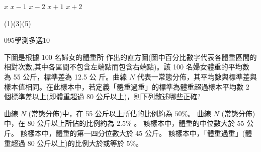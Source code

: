 \begin{QUESTIONS}
\begin{QUESTION}
\begin{QBODY}
			\begin{QOPSINONELINE} 
				\QOP $x$    \QOP $x-1$    \QOP $x-2$    \QOP $x+1$    \QOP $x+2$
			\end{QOPSINONELINE}
        \end{QBODY}
        \begin{QFROMS}
        \end{QFROMS}
        \begin{QTAGS}\end{QTAGS}
        \begin{QANS}
            (1)(3)(5)
        \end{QANS}
        \begin{QSOLLIST}
        \end{QSOLLIST}
        \begin{QEMPTYSPACE}
        \end{QEMPTYSPACE}
    \end{QUESTION}
    \begin{QUESTION}
        \begin{ExamInfo}{095}{學測}{多選}{10}
        \end{ExamInfo}
        \begin{ExamAnsRateInfo}{27}{48}{23}{10}
        \end{ExamAnsRateInfo}
        \begin{QBODY}
			下圖是根據 100 名婦女的體重所 作出的直方圖(圖中百分比數字代表各體重區間的相對次數,其中各區間不包含左端點而包含右端點)。該 100 名婦女體重的平均數 為 55 公斤，標準差為 12.5 公 斤。曲線 $N$ 代表一常態分佈，其平均數與標準差與樣本值相同。在此樣本中，若定義「體重過重」的標準為體重超過樣本平均數 2 個標準差以上(即體重超過 80 公斤以上)，則下列敘述哪些正確? 
			\begin{QOPS} 
				\QOP 曲線 $N$ (常態分佈)中，在 55 公斤以上所佔的比例約為 $50\%$。 
				\QOP 曲線 $N$ (常態分佈)中，在 80 公斤以上所佔的比例約為 $2.5\%$ 。  
				\QOP 該樣本中，體重的中位數大於 55 公斤。 
				\QOP 該樣本中，體重的第一四分位數大於 45 公斤。 
				\QOP 該樣本中，「體重過重」(體重超過 80 公斤以上)的比例大於或等於 $5\%$。
			\end{QOPS}
			

\end{QBODY}
\end{QUESTION}
\end{QUESTIONS}
